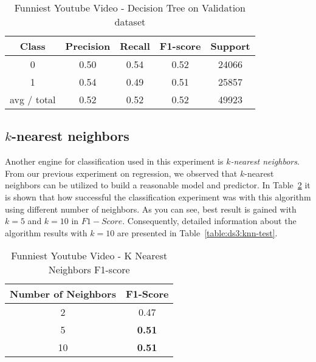 \begin{table}[p]
\begin{center}
\begin{tabular}{|c|c|c|c|c|}
\hline Class & Precision & Recall & F1-score & Support \\

\hline 0 & 0.50 & 0.54 & 0.52 & 24066\\
\hline 1 & 0.54 & 0.49 & 0.51 & 25857\\
\hline avg / total & 0.52 & 0.52 & 0.52 & 49923\\
\hline
\end{tabular}

\caption{Funniest Youtube Video - Decision Tree on Validation dataset}
\label{table:db2:decisiontree-test}
\end{center}
\end{table}

\subsection{$k$-nearest neighbors}

Another engine for classification used in this experiment is {\it
$k$-nearest neighbors}. From our previous experiment on regression, we observed
that $k$-nearest neighbors can be utilized to build a reasonable model and
predictor. In Table~\ref{table:ds3:knn} it is shown that how successful the
classification experiment was with this algorithm using different number of neighbors. As you
can see, best result is gained with $k=5$ and $k=10$ in $F1-Score$.
Consequently, detailed information about the algorithm results with $k=10$ are
presented in Table~\ref{table:ds3:knn-test}.


\begin{table}[p]
\begin{center}
\begin{tabular}{|c|c|}
\hline Number of Neighbors & F1-Score \\

\hline 2 & 0.47 \\
\hline 5 & {\bf 0.51} \\
\hline 10 & {\bf 0.51} \\

\hline
\end{tabular}

\caption{Funniest Youtube Video - K Nearest Neighbors  F1-score}
\label{table:ds3:knn}
\end{center}
\end{table}

